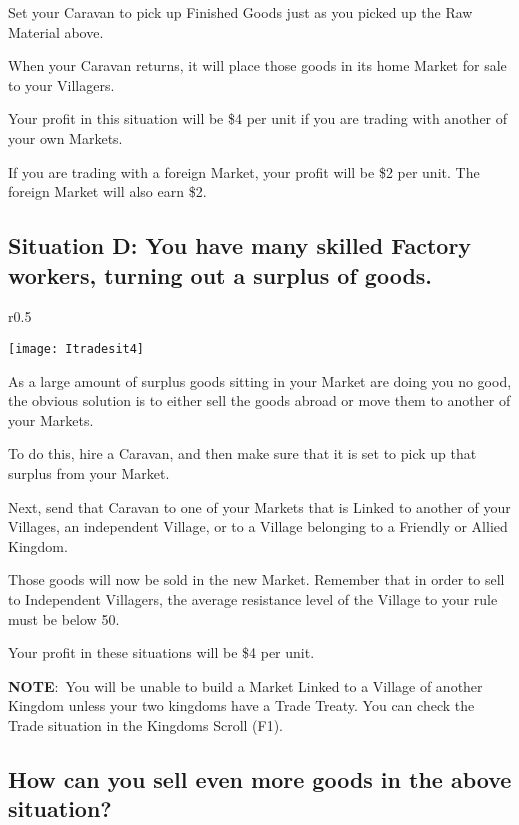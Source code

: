 Set your Caravan to pick up Finished Goods just as you picked up the Raw Material above.

When your Caravan returns, it will place those goods in its home Market for sale to your Villagers.

Your profit in this situation will be \$4 per unit if you are trading with another of your own Markets.

If you are trading with a foreign Market, your profit will be \$2 per unit. The foreign Market will also earn \$2.

\clearpage

\subsection{Situation D: You have many skilled Factory workers, turning out a surplus of goods.}

\begin{wrapfigure}{r}{0.5\textwidth}
	\vspace{-20pt}
	\begin{center}
		\texttt{[image: Itradesit4]}
	\end{center}
	\vspace{-20pt}
\end{wrapfigure}

As a large amount of surplus goods sitting in your Market are doing you no good, the obvious solution is to either sell the goods abroad or move them to another of your Markets.

To do this, hire a Caravan, and then make sure that it is set to pick up that surplus from your Market.

Next, send that Caravan to one of your Markets that is Linked to another of your Villages, an independent Village, or to a Village belonging to a Friendly or Allied Kingdom.

Those goods will now be sold in the new Market. Remember that in order to sell to Independent Villagers, the average resistance level of the Village to your rule must be below 50.

Your profit in these situations will be \$4 per unit.

\textbf{NOTE}: You will be unable to build a Market Linked to a Village of another Kingdom unless your two kingdoms have a Trade Treaty. You can check the Trade situation in the Kingdoms Scroll (F1).

\subsection{How can you sell even more goods in the above situation?}

